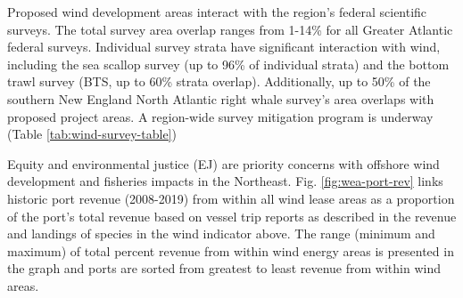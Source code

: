 \documentclass[
  10pt,
]{article}
\let\origtable\table
\let\endorigtable\endtable
\renewenvironment{table}[1][2] {
    \expandafter\origtable\expandafter[H]
} {
    \endorigtable
}
\begin{document}
Proposed wind development areas interact with the region's federal
scientific surveys. The total survey area overlap ranges from 1-14\% for
all Greater Atlantic federal surveys. Individual survey strata have
significant interaction with wind, including the sea scallop survey (up
to 96\% of individual strata) and the bottom trawl survey (BTS, up to
60\% strata overlap). Additionally, up to 50\% of the southern New
England North Atlantic right whale survey's area overlaps with proposed
project areas. A region-wide survey mitigation program is underway
(Table \ref{tab:wind-survey-table})

\begin{table}

\caption{\label{tab:wind-survey-table}Survey mitigation planning.}
\centering
{}
\end{table}

Equity and environmental justice (EJ) are priority concerns with
offshore wind development and fisheries impacts in the Northeast. Fig.
\ref{fig:wea-port-rev} links historic port revenue (2008-2019) from
within all wind lease areas as a proportion of the port's total revenue
based on vessel trip reports as described in the revenue and landings of
species in the wind indicator above. The range (minimum and maximum) of
total percent revenue from within wind energy areas is presented in the
graph and ports are sorted from greatest to least revenue from within
wind areas.
\end{document}
